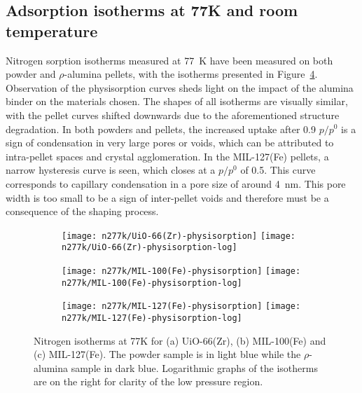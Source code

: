 
\subsection{Adsorption isotherms at 77K and room temperature}

Nitrogen sorption isotherms measured at \SI{77}{\kelvin} have been
measured on both powder and \(\rho\)-alumina pellets, with the isotherms
presented in Figure~\ref{fgr:shaping:n2adsorption}.
Observation of the physisorption curves sheds light on the 
impact of the alumina binder on the materials chosen.
The shapes of all isotherms are visually similar, with the pellet curves shifted
downwards due to the aforementioned structure degradation.
In both powders and pellets, the increased uptake after 0.9 \(p/p^0\) is a sign
of condensation in very large pores or voids, which can be attributed to 
intra-pellet spaces and crystal agglomeration.
In the MIL-127(Fe) pellets, a narrow hysteresis curve is seen, 
which closes at a \(p/p^0\) of 0.5. This curve corresponds to 
capillary condensation in a pore size of around \SI{4}{\nano\metre}. 
This pore width is too small to be a sign of 
inter-pellet voids and therefore must be a consequence of the shaping process.

\begin{figure}[p!]
    \centering
    
    \begin{subfigure}{\linewidth}
        \centering
        \parbox[c]{0.1\linewidth}{\caption{}\label{fgr:shaping:n277kuio66}}%
        \texttt{[image: n277k/UiO-66(Zr)-physisorption]}%
        \texttt{[image: n277k/UiO-66(Zr)-physisorption-log]}%
    \end{subfigure}

    \begin{subfigure}{\linewidth}
        \centering
        \parbox[c]{0.1\linewidth}{\caption{}\label{fgr:shaping:n277kuio66}}%
        \texttt{[image: n277k/MIL-100(Fe)-physisorption]}%
        \texttt{[image: n277k/MIL-100(Fe)-physisorption-log]}%
    \end{subfigure}

    \begin{subfigure}{\linewidth}
        \centering
        \parbox[c]{0.1\linewidth}{\caption{}\label{fgr:shaping:n277kmil127}}%
        \texttt{[image: n277k/MIL-127(Fe)-physisorption]}%
        \texttt{[image: n277k/MIL-127(Fe)-physisorption-log]}%
        \label{fgr:shaping:n277kmil127}
    \end{subfigure}
    
    \caption{Nitrogen isotherms at 77K for (a) UiO-66(Zr), 
    (b) MIL-100(Fe) and (c) MIL-127(Fe). The powder sample is in light
    blue while the \(\rho\)-alumina sample in dark blue. Logarithmic
    graphs of the isotherms are on the right for clarity of the low
    pressure region.}%
    \label{fgr:shaping:n2adsorption}
\end{figure}

